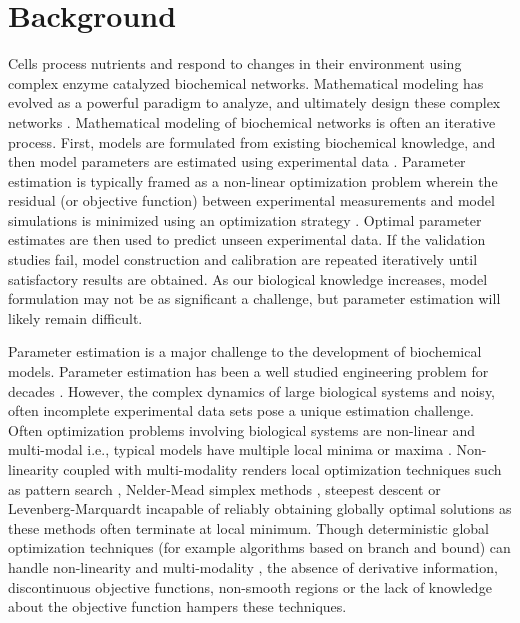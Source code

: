 \documentclass{bmcart}
\begin{document}
\section*{Background}
Cells process nutrients and respond to changes in their environment using complex enzyme catalyzed biochemical networks.
Mathematical modeling has evolved as a powerful paradigm to analyze, and ultimately design these complex networks \cite{assmus2006dynamics, Riel:2006aa,Jaqaman:2006aa,kitano2002systems,hood2004systems}.
Mathematical modeling of biochemical networks is often an iterative process.
First, models are formulated from existing biochemical knowledge, and then model parameters are estimated using experimental data \cite{Aldridge:2006aa,banga2008optimization,ashyraliyev2009systems}.
Parameter estimation is typically framed as a non-linear optimization problem wherein the residual (or objective function) between experimental measurements and model simulations is minimized using an optimization strategy \cite{moles2003parameter}.
Optimal parameter estimates are then used to predict unseen experimental data.
If the validation studies fail, model construction and calibration are repeated iteratively until satisfactory results are obtained.
As our biological knowledge increases, model formulation may not be as significant a challenge, but parameter estimation will likely remain difficult.

Parameter estimation is a major challenge to the development of biochemical models.
Parameter estimation has been a well studied engineering problem for decades \cite{nieman1971review,beck1977parameter,young1981parameter,beck1998inverse}.
However, the complex dynamics of large biological systems and noisy, often incomplete experimental data sets pose a unique estimation challenge.
Often optimization problems involving biological systems are non-linear and multi-modal i.e., typical models have multiple local minima or maxima \cite{moles2003parameter,banga2008optimization}.
Non-linearity coupled with multi-modality renders local optimization techniques such as pattern search \cite{hooke1961direct}, Nelder-Mead simplex methods \cite{nelder1965simplex}, steepest descent or Levenberg-Marquardt \cite{more1978levenberg} incapable of reliably obtaining globally optimal solutions as these methods often terminate at local minimum.
Though deterministic global optimization techniques (for example algorithms based on branch and bound) can handle non-linearity and multi-modality \cite{esposito2000deterministic,horst2013global},
the absence of derivative information, discontinuous objective functions, non-smooth regions or the lack of knowledge about the objective function hampers these techniques.
\end{document}
